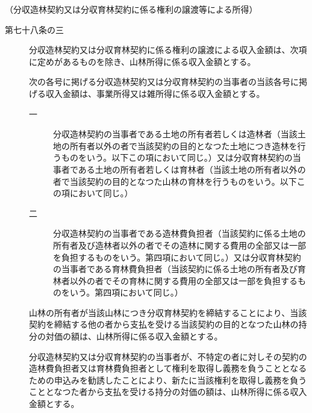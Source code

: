 \documentclass[twocolumn,a4j,10pt]{ltjtarticle}
\begin{document}
\noindent\hspace{10pt}（分収造林契約又は分収育林契約に係る権利の譲渡等による所得）
\begin{description}
\item[第七十八条の三]分収造林契約又は分収育林契約に係る権利の譲渡による収入金額は、次項に定めがあるものを除き、山林所得に係る収入金額とする。
\item[]次の各号に掲げる分収造林契約又は分収育林契約の当事者の当該各号に掲げる収入金額は、事業所得又は雑所得に係る収入金額とする。
\begin{description}
\item[一]分収造林契約の当事者である土地の所有者若しくは造林者（当該土地の所有者以外の者で当該契約の目的となつた土地につき造林を行うものをいう。以下この項において同じ。）又は分収育林契約の当事者である土地の所有者若しくは育林者（当該土地の所有者以外の者で当該契約の目的となつた山林の育林を行うものをいう。以下この項において同じ。）
\item[二]分収造林契約の当事者である造林費負担者（当該契約に係る土地の所有者及び造林者以外の者でその造林に関する費用の全部又は一部を負担するものをいう。第四項において同じ。）又は分収育林契約の当事者である育林費負担者（当該契約に係る土地の所有者及び育林者以外の者でその育林に関する費用の全部又は一部を負担するものをいう。第四項において同じ。）
\end{description}
\item[]山林の所有者が当該山林につき分収育林契約を締結することにより、当該契約を締結する他の者から支払を受ける当該契約の目的となつた山林の持分の対価の額は、山林所得に係る収入金額とする。
\item[]分収造林契約又は分収育林契約の当事者が、不特定の者に対しその契約の造林費負担者又は育林費負担者として権利を取得し義務を負うこととなるための申込みを勧誘したことにより、新たに当該権利を取得し義務を負うこととなつた者から支払を受ける持分の対価の額は、山林所得に係る収入金額とする。
\end{description}
\end{document}

